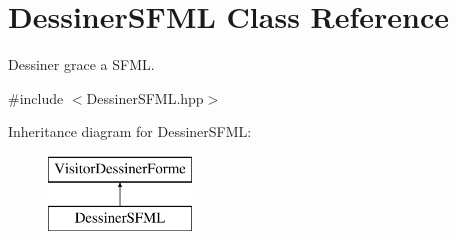 \hypertarget{class_dessiner_s_f_m_l}{}\section{Dessiner\+S\+F\+ML Class Reference}
\label{class_dessiner_s_f_m_l}


Dessiner grace a S\+F\+ML.  




{\ttfamily \#include $<$Dessiner\+S\+F\+M\+L.\+hpp$>$}

Inheritance diagram for Dessiner\+S\+F\+ML\+:\begin{figure}[H]
\begin{center}
\leavevmode
\includegraphics[height=2.000000cm]{class_dessiner_s_f_m_l}
\end{center}
\end{figure}

